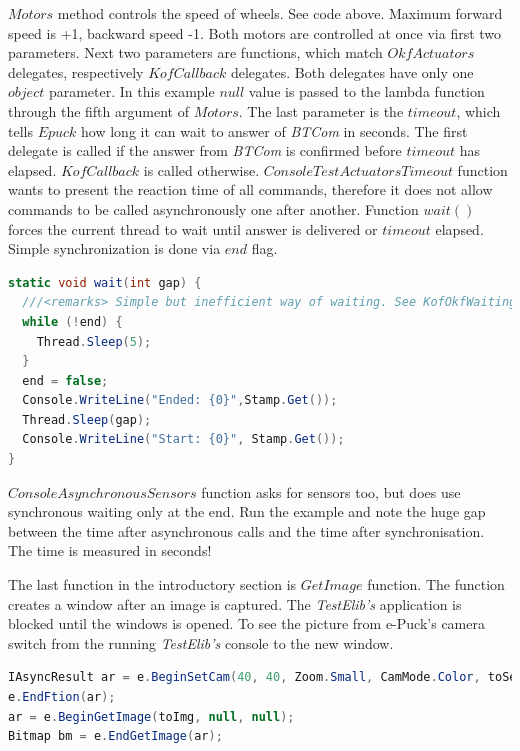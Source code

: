   $Motors$ method controls the speed of wheels. See code above. Maximum forward speed is +1, backward speed -1. 
  Both motors are controlled at once via first two parameters.
  Next two parameters are functions, which match $OkfActuators$ delegates,
  respectively $KofCallback$ delegates. 
  Both delegates have only one $object$ parameter. In this example $null$ value is passed
  to the lambda function through the fifth argument of $Motors$. The last parameter is the $timeout$, 
  which tells $Epuck$ how long it can wait to answer of {\it BTCom} in seconds.
  The first delegate is called if the answer from {\it BTCom} is confirmed 
  before $timeout$ has elapsed. 
  $KofCallback$ is called otherwise.
  $ConsoleTestActuatorsTimeout$ function wants to present the reaction time of all commands, 
  therefore it does not allow commands to be called asynchronously one after another.
  Function $wait()$ forces the current thread to wait until answer is delivered
  or $timeout$ elapsed. Simple synchronization is done via $end$ flag.
\begin{lstlisting}[language=cs]
static void wait(int gap) {
  ///<remarks> Simple but inefficient way of waiting. See KofOkfWaiting(..) in Behaviour for usage of EventWaitHandle.</remarks>
  while (!end) { 
    Thread.Sleep(5); 
  } 
  end = false; 
  Console.WriteLine("Ended: {0}",Stamp.Get());
  Thread.Sleep(gap);
  Console.WriteLine("Start: {0}", Stamp.Get());
}
\end{lstlisting}

  $ConsoleAsynchronousSensors$ function asks for sensors too, but does use synchronous waiting only at the end. Run the example and note the huge gap
  between the time after asynchronous calls and the time after synchronisation. 
  The time is measured in seconds!
  
  The last function in the introductory section is $GetImage$ function. 
  The function creates a window after an image is captured. 
  The {\it TestElib's} application is blocked until the windows is opened. To see the picture from
  e-Puck's camera switch from the running {\it TestElib's} console to the new window.


\begin{lstlisting}[language=cs]
IAsyncResult ar = e.BeginSetCam(40, 40, Zoom.Small, CamMode.Color, toSetCam, null, null);
e.EndFtion(ar);
ar = e.BeginGetImage(toImg, null, null);
Bitmap bm = e.EndGetImage(ar);	
\end{lstlisting}


